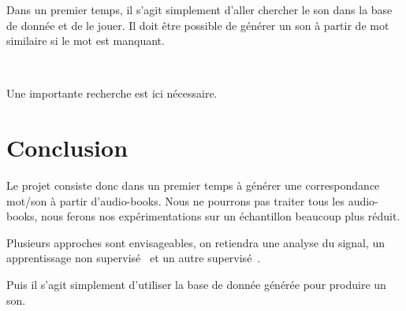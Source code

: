 		Dans un premier temps, il s'agit simplement d'aller chercher le son
	dans la base de donnée et de le jouer. Il doit être possible de générer un son
	à partir de mot similaire si le mot est manquant.
	
	~
	
		Une importante recherche est ici nécessaire.

	\section*{Conclusion}

	Le projet consiste donc dans un premier temps à générer une correspondance mot/son
	à partir d'audio-books. Nous ne pourrons pas traiter tous les audio-books, nous
	ferons nos expérimentations sur un échantillon beaucoup plus réduit.
	
	Plusieurs approches sont envisageables, on retiendra une analyse du signal, un
	apprentissage non supervisé~\cite{ludusan:hal-01026368} et un autre 
	supervisé~\cite{Panayotov2015}.
	
	Puis il s'agit simplement d'utiliser la base de donnée générée pour produire 
	un son.